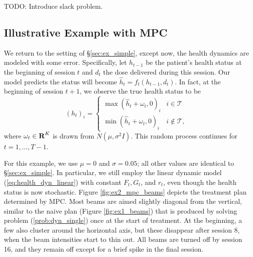 \documentclass[12pt]{article}
\begin{document}
TODO: Introduce slack problem.

\subsection{Illustrative Example with MPC}
\label{sec:ex_simple_mpc}
We return to the setting of \S\ref{sec:ex_simple}, except now, the health dynamics are modeled with some error. %
Specifically, let $h_{t-1}$ be the patient's health status at the beginning of session $t$ and $d_t$ the dose delivered during this session. Our model predicts the status will become $\hat h_t = f_t(h_{t-1},d_t)$. In fact, at the beginning of session $t+1$, we observe the true health status to be
\[
	(h_t)_i = \begin{cases}
		\max(\hat h_t + \omega_t, 0)_i & i \in \mathcal{T} \\
		\min(\hat h_t + \omega_t, 0)_i & i \notin \mathcal{T},
	\end{cases}
\]
where $\omega_t \in {\mbox{\bf R}}^K$ is drawn from $N(\mu,\sigma^2I)$. This random process continues for $t = 1,\ldots,T-1$. 

For this example, we use $\mu = 0$ and $\sigma = 0.05$; all other values are identical to \S\ref{sec:ex_simple}. In particular, we still employ the linear dynamic model (\ref{eq:health_dyn_linear}) with constant $F_t,G_t$, and $r_t$, even though the health status is now stochastic. Figure \ref{fig:ex2_mpc_beams} depicts the treatment plan determined by MPC. Most beams are aimed slightly diagonal from the vertical, similar to the naive plan (Figure \ref{fig:ex1_beams}) that is produced by solving problem (\ref{prob:dyn_single}) once at the start of treatment. At the beginning, a few also cluster around the horizontal axis, but these disappear after session 8, when the beam intensities start to thin out. All beams are turned off by session 16, and they remain off except for a brief spike in the final session. 
\end{document}
